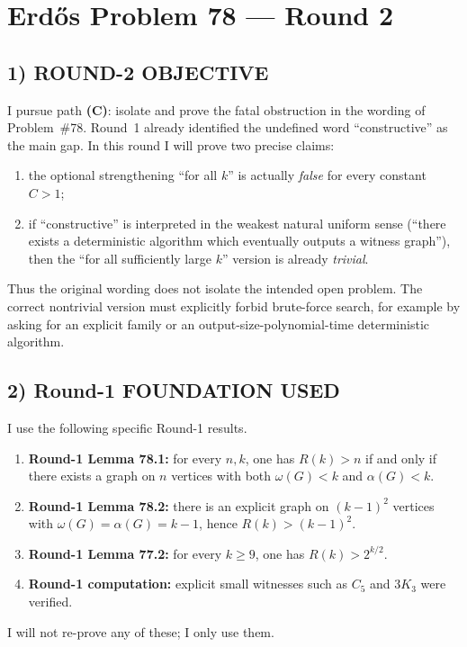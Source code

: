 \section{Erd\H{o}s Problem 78 --- Round 2}

\subsection*{1) ROUND-2 OBJECTIVE}

I pursue path \textbf{(C)}: isolate and prove the fatal obstruction in the wording of Problem~\#78.
Round~1 already identified the undefined word ``constructive'' as the main gap. In this round I will prove two precise claims:
\begin{enumerate}
\item the optional strengthening ``for all $k$'' is actually \emph{false} for every constant $C>1$;
\item if ``constructive'' is interpreted in the weakest natural uniform sense (``there exists a deterministic algorithm which eventually outputs a witness graph''), then the ``for all sufficiently large $k$'' version is already \emph{trivial}.
\end{enumerate}
Thus the original wording does not isolate the intended open problem. The correct nontrivial version must explicitly forbid brute-force search, for example by asking for an explicit family or an output-size-polynomial-time deterministic algorithm.

\subsection*{2) Round-1 FOUNDATION USED}

I use the following specific Round-1 results.
\begin{enumerate}
\item \textbf{Round-1 Lemma 78.1:} for every $n,k$, one has $R(k)>n$ if and only if there exists a graph on $n$ vertices with both $\omega(G)<k$ and $\alpha(G)<k$.
\item \textbf{Round-1 Lemma 78.2:} there is an explicit graph on $(k-1)^2$ vertices with $\omega(G)=\alpha(G)=k-1$, hence $R(k)>(k-1)^2$.
\item \textbf{Round-1 Lemma 77.2:} for every $k\ge 9$, one has $R(k)>2^{k/2}$.
\item \textbf{Round-1 computation:} explicit small witnesses such as $C_5$ and $3K_3$ were verified.
\end{enumerate}
I will not re-prove any of these; I only use them.

